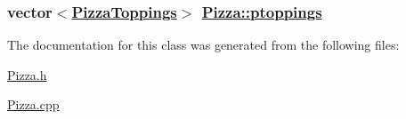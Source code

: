 \hypertarget{class_pizza_00a8ee0e60c8a0813bd0253e2ce99090}{
\subsubsection[ptoppings]{\setlength{\rightskip}{0pt plus 5cm}vector$<$\hyperlink{class_pizza_toppings}{Pizza\-Toppings}$>$ \hyperlink{class_pizza_00a8ee0e60c8a0813bd0253e2ce99090}{Pizza::ptoppings}}}
\label{class_pizza_00a8ee0e60c8a0813bd0253e2ce99090}




The documentation for this class was generated from the following files:\begin{CompactItemize}
\item 
\hyperlink{_pizza_8h}{Pizza.h}\item 
\hyperlink{_pizza_8cpp}{Pizza.cpp}\end{CompactItemize}
